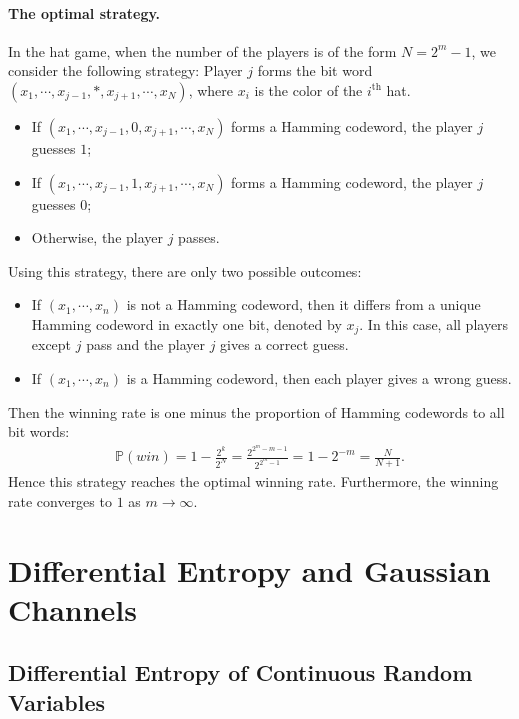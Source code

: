 \documentclass{article}
\numberwithin{equation}{section}
\newcommand{\bbP}{\mathbb{P}}
\theoremstyle{plain}
\theoremstyle{definition}
\begin{document}
\paragraph{The optimal strategy.} In the hat game, when the number of the players is of the form $N=2^m-1$, we consider the following strategy: Player $j$ forms the bit word $(x_1,\cdots,x_{j-1},*,x_{j+1},\cdots,x_N)$, where $x_i$ is the color of the $i^\text{th}$ hat.
\begin{itemize}
\item If $(x_1,\cdots,x_{j-1},0,x_{j+1},\cdots,x_N)$ forms a Hamming codeword, the player $j$ guesses $1$;
\item If $(x_1,\cdots,x_{j-1},1,x_{j+1},\cdots,x_N)$ forms a Hamming codeword, the player $j$ guesses $0$;
\item Otherwise, the player $j$ passes.
\end{itemize}
Using this strategy, there are only two possible outcomes:
\begin{itemize}
\item If $(x_1,\cdots,x_n)$ is not a Hamming codeword, then it differs from a unique Hamming codeword in exactly one bit, denoted by $x_j$. In this case, all players except $j$ pass and the player $j$ gives a correct guess.
\item If $(x_1,\cdots,x_n)$ is a Hamming codeword, then each player gives a wrong guess.
\end{itemize}
Then the winning rate is one minus the proportion of Hamming codewords to all bit words:
\begin{align*}
	\bbP(win)=1-\frac{2^k}{2^N}=\frac{2^{2^m-m-1}}{2^{2^m-1}}=1-2^{-m}=\frac{N}{N+1}.
\end{align*}
Hence this strategy reaches the optimal winning rate. Furthermore, the winning rate converges to $1$ as $m\to\infty$.



\newpage
\section{Differential Entropy and Gaussian Channels}
\subsection{Differential Entropy of Continuous Random Variables}
\end{document}
